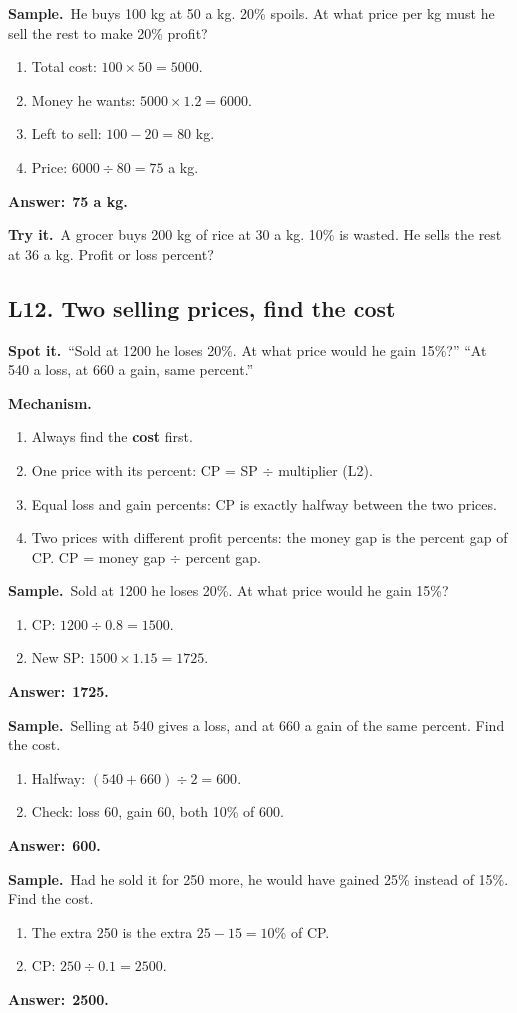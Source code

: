\documentclass[11pt,a4paper]{article}
\let\oldsubsection\subsection
\renewcommand{\subsection}{\needspace{9\baselineskip}\oldsubsection}
\newcommand{\spot}{\textbf{\color{ember}Spot it.}\ }
\newcommand{\mech}{\textbf{\color{ember}Mechanism.}\ }
\newif\ifkeepsamp
\newcommand{\ans}[1]{\par\nopagebreak\noindent\textbf{\color{ember}Answer:}\ \textbf{#1}\par}
\newcommand{\samp}{\ifkeepsamp\needspace{4\baselineskip}\fi\textbf{\color{ember}Sample.}\ }
\newcommand{\tryit}[1]{\textbf{\color{ember}Try it.}\ #1}
\begin{document}
\samp He buys 100 kg at 50 a kg. 20\% spoils. At what price per kg must he sell the rest to make 20\% profit?
\begin{enumerate}
\item Total cost: $100 \times 50 = 5000$.
\item Money he wants: $5000 \times 1.2 = 6000$.
\item Left to sell: $100 - 20 = 80$ kg.
\item Price: $6000 \div 80 = 75$ a kg.
\end{enumerate}
\ans{75 a kg.}

\tryit A grocer buys 200 kg of rice at 30 a kg. 10\% is wasted. He sells the rest at 36 a kg. Profit or loss percent?

\subsection{L12. Two selling prices, find the cost}
\spot ``Sold at 1200 he loses 20\%. At what price would he gain 15\%?'' ``At 540 a loss, at 660 a gain, same percent.''

\mech
\begin{enumerate}
\item Always find the \textbf{cost} first.
\item One price with its percent: CP = SP $\div$ multiplier (L2).
\item Equal loss and gain percents: CP is exactly halfway between the two prices.
\item Two prices with different profit percents: the money gap is the percent gap of CP. CP = money gap $\div$ percent gap.
\end{enumerate}

\samp Sold at 1200 he loses 20\%. At what price would he gain 15\%?
\begin{enumerate}
\item CP: $1200 \div 0.8 = 1500$.
\item New SP: $1500 \times 1.15 = 1725$.
\end{enumerate}
\ans{1725.}

\samp Selling at 540 gives a loss, and at 660 a gain of the same percent. Find the cost.
\begin{enumerate}
\item Halfway: $(540 + 660) \div 2 = 600$.
\item Check: loss 60, gain 60, both 10\% of 600.
\end{enumerate}
\ans{600.}

\samp Had he sold it for 250 more, he would have gained 25\% instead of 15\%. Find the cost.
\begin{enumerate}
\item The extra 250 is the extra $25 - 15 = 10\%$ of CP.
\item CP: $250 \div 0.1 = 2500$.
\end{enumerate}
\ans{2500.}
\end{document}

